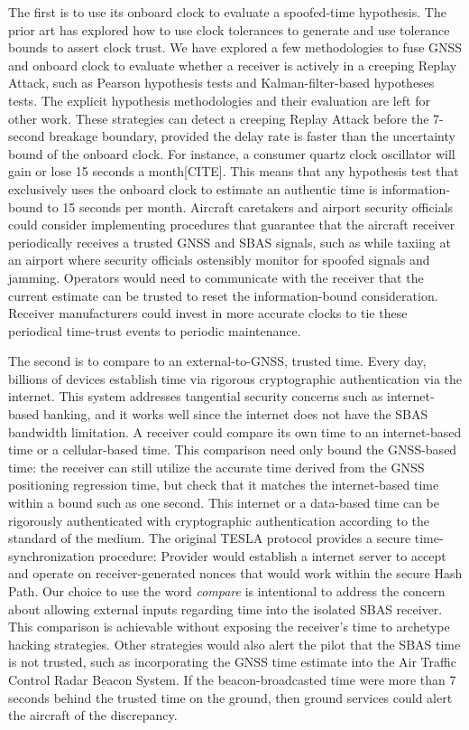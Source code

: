 \documentclass[letterpaper,times]{IONconf/IONconf}
\begin{document}
The first is to use its onboard clock to evaluate a spoofed-time hypothesis.
The prior art has explored how to use clock tolerances to generate and use tolerance bounds to assert clock trust\cite{time_sync_paper}.
We have explored a few methodologies to fuse GNSS and onboard clock to evaluate whether a receiver is actively in a creeping Replay Attack, such as Pearson hypothesis tests and Kalman-filter-based hypotheses tests.
The explicit hypothesis methodologies and their evaluation are left for other work.
These strategies can detect a creeping Replay Attack before the 7-second breakage boundary, provided the delay rate is faster than the uncertainty bound of the onboard clock.
For instance, a consumer quartz clock oscillator will gain or lose 15 seconds a month[CITE].
This means that any hypothesis test that exclusively uses the onboard clock to estimate an authentic time is information-bound to 15 seconds per month.
Aircraft caretakers and airport security officials could consider implementing procedures that guarantee that the aircraft receiver periodically receives a trusted GNSS and SBAS signals, such as while taxiing at an airport where security officials ostensibly monitor for spoofed signals and jamming.
Operators would need to communicate with the receiver that the current estimate can be trusted to reset the information-bound consideration.
Receiver manufacturers could invest in more accurate clocks to tie these periodical time-trust events to periodic maintenance.

The second is to compare to an external-to-GNSS, trusted time.
Every day, billions of devices establish time via rigorous cryptographic authentication via the internet.
This system addresses tangential security concerns such as internet-based banking, and it works well since the internet does not have the SBAS bandwidth limitation.
A receiver could compare its own time to an internet-based time or a cellular-based time.
This comparison need only bound the GNSS-based time: the receiver can still utilize the accurate time derived from the GNSS positioning regression time, but check that it matches the internet-based time within a bound such as one second.
This internet or a data-based time can be rigorously authenticated with cryptographic authentication according to the standard of the medium.
The original TESLA protocol provides a secure time-synchronization procedure: Provider would establish a internet server to accept and operate on receiver-generated nonces that would work within the secure Hash Path\cite{perrig2005timed}.
Our choice to use the word {\em compare} is intentional to address the concern about allowing external inputs regarding time into the isolated SBAS receiver.
This comparison is achievable without exposing the receiver's time to archetype hacking strategies.
Other strategies would also alert the pilot that the SBAS time is not trusted, such as incorporating the GNSS time estimate into the Air Traffic Control Radar Beacon System.
If the beacon-broadcasted time were more than 7 seconds behind the trusted time on the ground, then ground services could alert the aircraft of the discrepancy.
\end{document}
